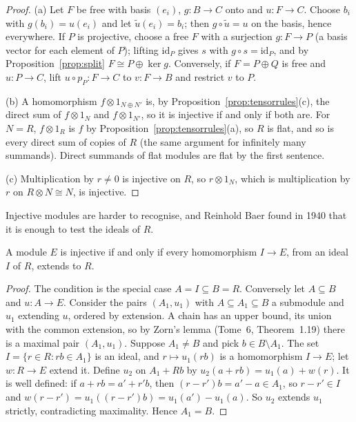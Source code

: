 \begin{proof}
(a) Let $F$ be free with basis $(e_i)$, $g\colon B\to C$ onto and $u\colon F\to C$. Choose $b_i$ with $g(b_i)=u(e_i)$ and let $\tilde u(e_i)=b_i$; then $g\circ\tilde u=u$ on the basis, hence everywhere. If $P$ is projective, choose a free $F$ with a
surjection $g\colon F\to P$ (a basis vector for each element of $P$); lifting $\mathrm{id}_P$ gives $s$ with $g\circ s=\mathrm{id}_P$, and by Proposition~\ref{prop:split} $F\cong P\oplus\ker g$. Conversely, if $F=P\oplus Q$ is free and $u\colon P\to C$, lift
$u\circ p_P\colon F\to C$ to $v\colon F\to B$ and restrict $v$ to $P$.

(b) A homomorphism $f\otimes1_{N\oplus N'}$ is, by Proposition~\ref{prop:tensorrules}(c), the direct sum of $f\otimes1_N$ and $f\otimes1_{N'}$, so it is injective if and only if both are. For $N=R$, $f\otimes1_R$ is $f$ by
Proposition~\ref{prop:tensorrules}(a), so $R$ is flat, and so is every direct sum of copies of $R$ (the same argument for infinitely many summands). Direct summands of flat modules are flat by the first sentence.

(c) Multiplication by $r\ne0$ is injective on $R$, so $r\otimes1_N$, which is multiplication by $r$ on $R\otimes N\cong N$, is injective.
\end{proof}

Injective modules are harder to recognise, and Reinhold Baer found in 1940 that it is enough to test the ideals of $R$.

\begin{theorem}\label{thm:baer}
A module $E$ is injective if and only if every homomorphism $I\to E$, from an ideal $I$ of $R$, extends to $R$.
\end{theorem}

\begin{proof}
The condition is the special case $A=I\subseteq B=R$. Conversely let $A\subseteq B$ and $u\colon A\to E$. Consider the pairs $(A_1,u_1)$ with $A\subseteq A_1\subseteq B$ a submodule and $u_1$ extending $u$, ordered by extension. A chain has an upper bound,
its union with the common extension, so by Zorn's lemma (Tome~6, Theorem~1.19) there is a maximal pair $(A_1,u_1)$. Suppose $A_1\ne B$ and pick $b\in B\setminus A_1$. The set $I=\{r\in R:rb\in A_1\}$ is an ideal, and $r\mapsto u_1(rb)$ is a
homomorphism $I\to E$; let $w\colon R\to E$ extend it. Define $u_2$ on $A_1+Rb$ by $u_2(a+rb)=u_1(a)+w(r)$. It is well defined: if $a+rb=a'+r'b$, then $(r-r')b=a'-a\in A_1$, so $r-r'\in I$ and $w(r-r')=u_1((r-r')b)=u_1(a')-u_1(a)$. So $u_2$
extends $u_1$ strictly, contradicting maximality. Hence $A_1=B$.
\end{proof}

